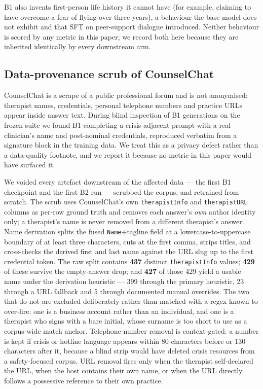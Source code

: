 B1 also invents first-person life
history it cannot have (for example, claiming to have overcome a fear of flying over
three years), a behaviour the base model does not exhibit and that SFT on peer-support
dialogue introduced. Neither behaviour is scored by any metric in this paper; we record
both here because they are inherited identically by every downstream arm.

\subsection{Data-provenance scrub of CounselChat}
\label{sec:methods:scrub}

CounselChat is a scrape of a public professional forum and is not anonymised: therapist
names, credentials, personal telephone numbers and practice URLs appear inside answer
text. During blind inspection of B1 generations on the frozen suite we found B1
completing a crisis-adjacent prompt with a real clinician's name and post-nominal
credentials, reproduced verbatim from a signature block in the training data. We treat
this as a privacy defect rather than a data-quality footnote, and we report it because
no metric in this paper would have surfaced it.

We voided every artefact downstream of the affected data --- the first B1 checkpoint and
the first B2 run --- scrubbed the corpus, and retrained from scratch. The scrub uses
CounselChat's own \texttt{therapistInfo} and \texttt{therapistURL} columns as per-row
ground truth and removes each answer's \emph{own} author identity only; a therapist's
name is never removed from a different therapist's answer. Name derivation splits the
fused \texttt{Name}+tagline field at a lowercase-to-uppercase boundary of at least three
characters, cuts at the first comma, strips titles, and cross-checks the derived first
and last name against the URL slug up to the first credential token. The raw split
contains \textbf{437} distinct \texttt{therapistInfo} values; \textbf{429} of these survive
the empty-answer drop; and \textbf{427} of those 429 yield a usable name under the
derivation heuristic --- 399 through the primary heuristic, 23 through a URL fallback and
5 through documented manual overrides. The two that do not are excluded deliberately
rather than matched with a regex known to over-fire: one is a business account rather than
an individual, and one is a therapist who signs with a bare initial, whose surname is too
short to use as a corpus-wide match anchor.
Telephone-number removal is context-gated: a number is kept if crisis or hotline language
appears within 80 characters before or 130 characters after it, because a blind strip
would have deleted crisis resources from a safety-focused corpus. URL removal fires only
when the therapist self-declared the URL, when the host contains their own name, or when
the URL directly follows a possessive reference to their own practice.


